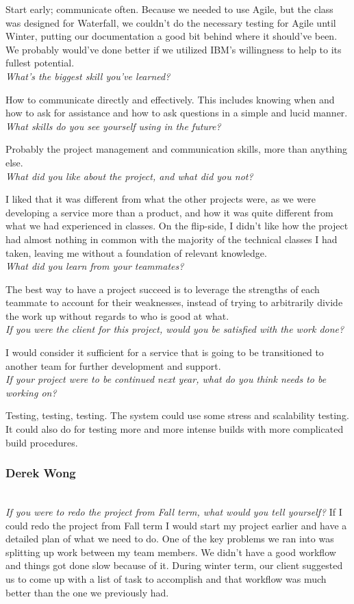 \documentclass[10pt,letterpaper,onecolumn,draftclsnofoot]{IEEEtran}
\begin{document}
Start early; communicate often. Because we needed to use Agile, but the class was designed for Waterfall, we couldn't do the necessary testing for Agile until Winter, putting our documentation a good bit behind where it should've been. We probably would've done better if we utilized IBM's willingness to help to its fullest potential.
\textit{\\What's the biggest skill you've learned?}

How to communicate directly and effectively. This includes knowing when and how to ask for assistance and how to ask questions in a simple and lucid manner.
\textit{\\What skills do you see yourself using in the future?}

Probably the project management and communication skills, more than anything else.
\textit{\\What did you like about the project, and what did you not?}

I liked that it was different from what the other projects were, as we were developing a service more than a product, and how it was quite different from what we had experienced in classes. On the flip-side, I didn't like how the project had almost nothing in common with the majority of the technical classes I had taken, leaving me without a foundation of relevant knowledge.
\textit{\\What did you learn from your teammates?}

The best way to have a project succeed is to leverage the strengths of each teammate to account for their weaknesses, instead of trying to arbitrarily divide the work up without regards to who is good at what.
\textit{\\If you were the client for this project, would you be satisfied with the work done?}

I would consider it sufficient for a service that is going to be transitioned to another team for further development and support.
\textit{\\If your project were to be continued next year, what do you think needs to be working on?}

Testing, testing, testing. The system could use some stress and scalability testing. It could also do for testing more and more intense builds with more complicated build procedures.\\

\subsubsection{Derek Wong}
\textit{\\If you were to redo the project from Fall term, what would you tell yourself?}
If I could redo the project from Fall term I would start my project earlier and have a detailed plan of what we need to do. One of the key problems we ran into was splitting up work between my team members. We didn't have a good workflow and things got done slow because of it. During winter term, our client suggested us to come up with a list of task to accomplish and that workflow was much better than the one we previously had.
\end{document}
